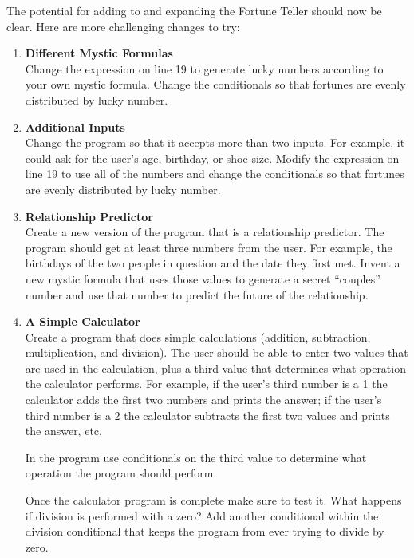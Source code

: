 The potential for adding to and expanding the Fortune Teller should now be clear.  Here are more challenging changes to try:
\begin{enumerate}[{\bf 1.}]

\item {\bf Different Mystic Formulas} \\
Change the expression on line 19 to generate lucky numbers according to your own mystic formula.  Change the conditionals so that fortunes are evenly distributed by lucky number.

\item {\bf Additional Inputs} \\
Change the program so that it accepts more than two inputs.  For example, it could ask for the user's age, birthday, or shoe size.  Modify the expression on line 19 to use all of the numbers and change the conditionals so that fortunes are evenly distributed by lucky number.

\item {\bf Relationship Predictor}\\
Create a new version of the program that is a relationship predictor.   The program should get at least three numbers from the user.  For example, the birthdays of the two people in question and the date they first met.  Invent a new mystic formula that uses those values to generate a secret ``couples'' number and use that number to predict the future of the relationship.

\item {\bf A Simple Calculator}\\
Create a program that does simple calculations (addition, subtraction, multiplication, and division).  The user should be able to enter two values that are used in the calculation, plus a third value that determines what operation the calculator performs.  For example,  if the user's third number is a 1 the calculator adds the first two numbers and prints the answer; if the user's third number is a 2 the calculator subtracts the first two values and prints the answer, etc.  

In the program use conditionals on the third value to determine what operation the program should perform:\\

Once the calculator program is complete make sure to test it.  What happens if division is performed with a zero?  Add another conditional within the division conditional that keeps the program from ever trying to divide by zero.




\end{enumerate}


